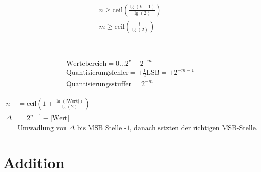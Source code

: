 \begin{boxleft}
\\
\\
\\
\end{boxleft}\begin{boxrightshaded}
\begin{align*}
&n\geq\text{ceil}\left(\frac{\lg\left(k+1\right)}{\lg\left(2\right)}\right)\\
&m\geq\text{ceil}\left(\frac{l}{\lg\left( 2\right)}\right)
\end{align*}
\end{boxrightshaded}

\begin{boxleft}
\\
\end{boxleft}\begin{boxrightshaded}
\begin{align*}
&\text{Wertebereich}=0\dots 2^n-2^{-m}\\
&\text{Quantisierungsfehler}=\pm\frac{1}{2}\text{LSB}=\pm 2^{-m-1}\\
&\text{Quantisierungsstuffen}=2^{-m}
\end{align*}
\end{boxrightshaded}

\begin{boxleft}
\end{boxleft}\begin{boxrightshaded}
\begin{align*}
n&=\text{ceil}\left(1+\frac{\lg\left(|\text{Wert}|\right)}{\lg\left(2\right)}\right)\\
\Delta&=2^{n-1}-\left|\text{Wert}\right|\\
&\text{Umwadlung von $\Delta$ bis MSB Stelle -1, danach setzten der richtigen MSB-Stelle.}
\end{align*}
\end{boxrightshaded}

\section{Addition}

